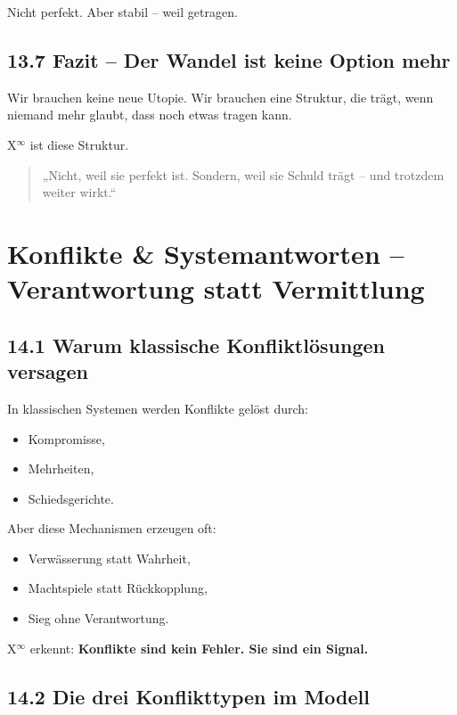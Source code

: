 \documentclass[12pt,a4paper]{book}
\begin{document}
Nicht perfekt.  
Aber stabil – weil getragen.

\section*{13.7 Fazit – Der Wandel ist keine Option mehr}

Wir brauchen keine neue Utopie.  
Wir brauchen eine Struktur, die trägt,  
wenn niemand mehr glaubt, dass noch etwas tragen kann.

X$^\infty$ ist diese Struktur.

\begin{quote}
„Nicht, weil sie perfekt ist.  
Sondern, weil sie Schuld trägt – und trotzdem weiter wirkt.“  
\end{quote}

\chapter{Konflikte \& Systemantworten – Verantwortung statt Vermittlung}

\section*{14.1 Warum klassische Konfliktlösungen versagen}

In klassischen Systemen werden Konflikte gelöst durch:

\begin{itemize}
    \item Kompromisse,
    \item Mehrheiten,
    \item Schiedsgerichte.
\end{itemize}

Aber diese Mechanismen erzeugen oft:

\begin{itemize}
    \item Verwässerung statt Wahrheit,
    \item Machtspiele statt Rückkopplung,
    \item Sieg ohne Verantwortung.
\end{itemize}

X$^\infty$ erkennt:  
\textbf{Konflikte sind kein Fehler. Sie sind ein Signal.}

\section*{14.2 Die drei Konflikttypen im Modell}
\end{document}

